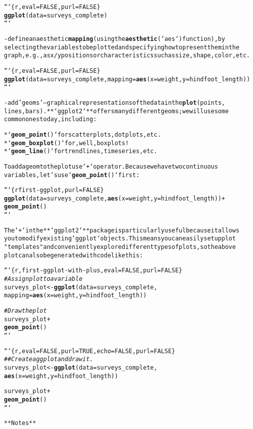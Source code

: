 \documentclass{article}\usepackage[]{graphicx}\usepackage[]{xcolor}
\makeatletter
\newcommand{\hlstr}[1]{\textcolor[rgb]{0.192,0.494,0.8}{#1}}%
\newcommand{\hlcom}[1]{\textcolor[rgb]{0.678,0.584,0.686}{\textit{#1}}}%
\newcommand{\hlkwd}[1]{\textcolor[rgb]{0.737,0.353,0.396}{\textbf{#1}}}%
\newenvironment{kframe}{%
 \def\at@end@of@kframe{}%
 \ifinner\ifhmode%
  \def\at@end@of@kframe{\end{minipage}}%
  \begin{minipage}{\columnwidth}%
 \fi\fi%
 \def\FrameCommand##1{\hskip\@totalleftmargin \hskip-\fboxsep
 \colorbox{shadecolor}{##1}\hskip-\fboxsep
     \hskip-\linewidth \hskip-\@totalleftmargin \hskip\columnwidth}%
 \MakeFramed {\advance\hsize-\width
   \@totalleftmargin\z@ \linewidth\hsize
   \@setminipage}}%
 {\par\unskip\endMakeFramed%
 \at@end@of@kframe}
\newenvironment{knitrout}{}{} %
\makeatother
\begin{document}
\begin{knitrout}
\begin{kframe}
\begin{alltt}
```\{r, eval = FALSE, purl = FALSE\}
\hlkwd{ggplot}(data = surveys_complete)
```

- define an aesthetic \hlkwd{mapping} (using the \hlkwd{aesthetic} (`aes`) function), by
selecting the variables to be plotted and specifying how to present them in the
graph, e.g., as x/y positions or characteristics such as size, shape, color, etc.      

```\{r, eval = FALSE, purl = FALSE\}
\hlkwd{ggplot}(data = surveys_complete, mapping = \hlkwd{aes}(x = weight, y = hindfoot_length))
```

- add \hlstr{'geoms'} – graphical representations of the data in the \hlkwd{plot} (points,
  lines, bars). **`ggplot2`** offers many different geoms; we will use some
  common ones today, including:

  * `\hlkwd{geom_point}()` for scatter plots, dot plots, etc.
  * `\hlkwd{geom_boxplot}()` for, well, boxplots!
  * `\hlkwd{geom_line}()` for trend lines, time series, etc.  

To add a geom to the plot use `+` operator. Because we have two continuous
variables, let's use `\hlkwd{geom_point}()` first:

```\{r first-ggplot, purl = FALSE\}
\hlkwd{ggplot}(data = surveys_complete, \hlkwd{aes}(x = weight, y = hindfoot_length)) +
  \hlkwd{geom_point}()
```

The `+` in the **`ggplot2`** package is particularly useful because it allows
you to modify existing `ggplot` objects. This means you can easily set up plot
\hlstr{"templates"} and conveniently explore different types of plots, so the above
plot can also be generated with code like this:

```\{r, first-ggplot-with-plus, eval = FALSE, purl = FALSE\}
\hlcom{# Assign plot to a variable}
surveys_plot <- \hlkwd{ggplot}(data = surveys_complete,
                       mapping = \hlkwd{aes}(x = weight, y = hindfoot_length))

\hlcom{# Draw the plot}
surveys_plot +
    \hlkwd{geom_point}()
```

```\{r, eval = FALSE, purl = TRUE, echo = FALSE, purl = FALSE\}
\hlcom{## Create a ggplot and draw it.}
surveys_plot <- \hlkwd{ggplot}(data = surveys_complete,
                       \hlkwd{aes}(x = weight, y = hindfoot_length))

surveys_plot +
  \hlkwd{geom_point}()
```

**Notes**


\end{alltt}
\end{kframe}
\end{knitrout}
\end{document}
